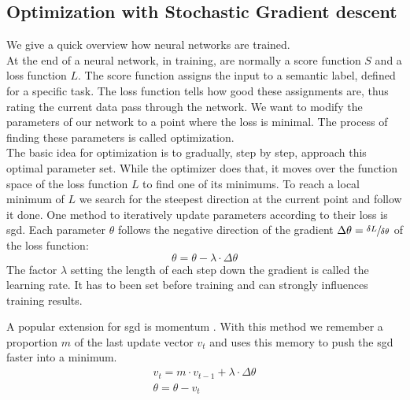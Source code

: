 \subsection{Optimization with Stochastic Gradient descent}
\label{sub:concepts:nn:gd}
We give a quick overview how neural networks are trained.\\
At the end of a neural network, in training, are normally a score function $S$ and a loss function $L$. The score function assigns the input to a semantic label, defined for a specific task. The loss function tells how good these assignments are, thus rating the current data pass through the network. We want to modify the parameters of our network to a point where the loss is minimal. The process of finding these parameters is called optimization.\\
The basic idea for optimization is to gradually, step by step, approach this optimal parameter set. While the optimizer does that, it moves over the function space of the loss function $L$ to find one of its minimums. To reach a local minimum of $L$ we search for the steepest direction at the current point and follow it done. One method to iteratively update parameters according to their loss is \acrfull{sgd}. Each parameter $\theta$ follows the negative direction of the gradient $\Delta\theta = \sfrac{\delta L}{\delta \theta}$ of the loss function:
\begin{equation}
    \theta = \theta - \lambda \cdot \Delta \theta
\end{equation}
The factor $\lambda$ setting the length of each step down the gradient is called the learning rate. It has to been set before training and can strongly influences training results.

A popular extension for \gls{sgd} is momentum \citep{qian_momentum_1999}. With this method we remember a proportion $m$ of the last update vector $v_t$ and uses this memory to push the \gls{sgd} faster into a minimum.
\begin{equation}
    \begin{aligned}
        v_t = m\cdot v_{t-1} + \lambda \cdot \Delta \theta\\
        \theta = \theta - v_t
    \end{aligned}
\end{equation}

